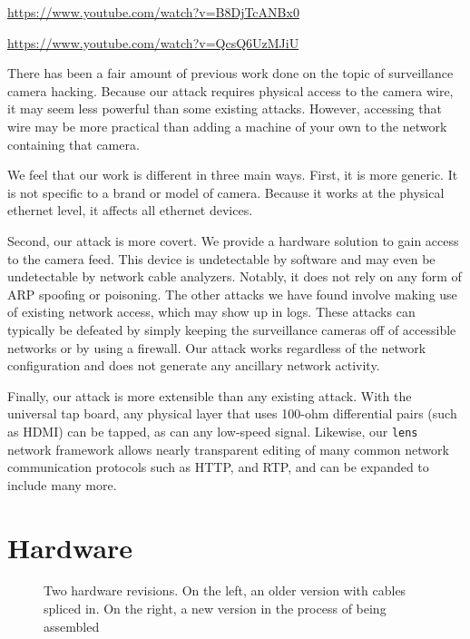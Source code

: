 \documentclass[12pt]{article}
\begin{document}
\url{https://www.youtube.com/watch?v=B8DjTcANBx0}

\noindent
\url{https://www.youtube.com/watch?v=QcsQ6UzMJiU}

There has been a fair amount of previous work done on the topic of surveillance camera hacking. Because our attack requires physical access to the camera wire, it may seem less powerful than some existing attacks. However, accessing that wire may be more practical than adding a machine of your own to the network containing that camera.

We feel that our work is different in three main ways. First, it is more generic. It is not specific to a brand or model of camera. Because it works at the physical ethernet level, it affects all ethernet devices.

Second, our attack is more covert. We provide a hardware solution to gain access to the camera feed. This device is undetectable by software and may even be undetectable by network cable analyzers. Notably, it does not rely on any form of ARP spoofing or poisoning. The other attacks we have found involve making use of existing network access, which may show up in logs. These attacks can typically be defeated by simply keeping the surveillance cameras off of accessible networks or by using a firewall. Our attack works regardless of the network configuration and does not generate any ancillary network activity. 

Finally, our attack is more extensible than any existing attack. With the universal tap board, any physical layer that uses 100-ohm differential pairs (such as HDMI) can be tapped, as can any low-speed signal. Likewise, our \texttt{lens} network framework allows nearly transparent editing of many common network communication protocols such as HTTP, and RTP, and can be expanded to include many more.

\section{Hardware}

\begin{figure}[h]
    \centering
    \caption{Two hardware revisions. On the left, an older version with cables spliced in. On the right, a new version in the process of being assembled}
\end{figure}

\newcommand{\textport}[1]{\texttt{#1}}
\end{document}
